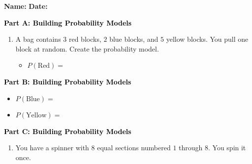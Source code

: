 \documentclass[12pt, letterpaper, fleqn]{article}
\newcommand{\blank}{\underline{\hspace{2.2cm}}}
\begin{document}
\textbf{Name:} \underline{\hspace{5cm}}
\hfill
\textbf{Date:} \underline{\hspace{3cm}}\\

\begin{tcolorbox}[colback=customteal!20]
\large\textcolor{black}{\textbf{Part A: Building Probability Models}}
\end{tcolorbox}

\vspace{3mm}

\begin{enumerate}[itemsep=2.5cm, leftmargin=0.6cm]
\item A bag contains $3$ red blocks, $2$ blue blocks, and $5$ yellow blocks. You pull one block at random. Create the probability model.
\begin{itemize}
\item $P(\text{Red}) = $ \blank
\end{itemize}
\end{enumerate}

\newpage

\begin{tcolorbox}[colback=customteal!20]
\large\textcolor{black}{\textbf{Part B: Building Probability Models}}
\end{tcolorbox}

\vspace{3mm}

\begin{enumerate}[itemsep=2.5cm, leftmargin=0.6cm, resume]
\begin{itemize}
\item $P(\text{Blue}) = $ \blank
\item $P(\text{Yellow}) = $ \blank
\end{itemize}
\end{enumerate}

\newpage

\begin{tcolorbox}[colback=customteal!20]
\large\textcolor{black}{\textbf{Part C: Building Probability Models}}
\end{tcolorbox}

\vspace{3mm}

\begin{enumerate}[itemsep=2.5cm, leftmargin=0.6cm, resume]
\begin{itemize}
\item Do the probabilities add up to exactly $1$? \blank
\end{itemize}
\item You have a spinner with $8$ equal sections numbered $1$ through $8$. You spin it once. 
\end{enumerate}
\end{document}
